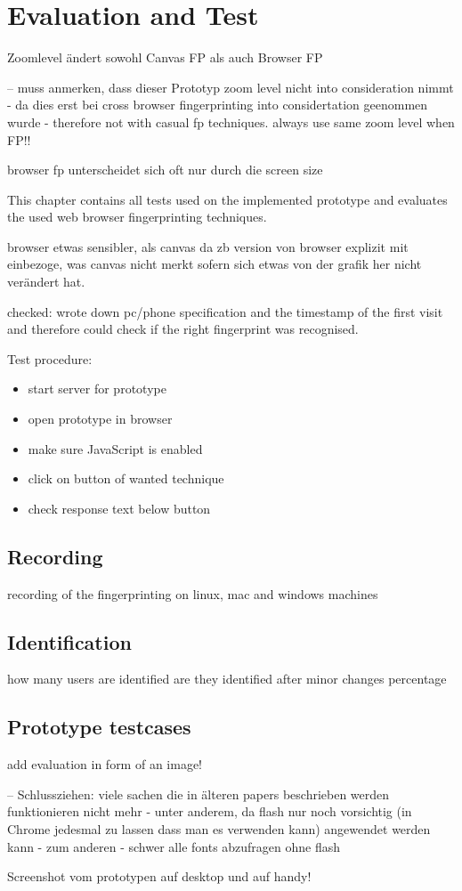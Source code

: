 \chapter{Evaluation and Test}
\label{cha:evaluation}
Zoomlevel ändert sowohl Canvas FP als auch Browser FP

-- muss anmerken, dass dieser Prototyp zoom level nicht into consideration nimmt - da dies erst bei cross browser fingerprinting into considertation geenommen wurde - therefore not with casual fp techniques. always use same zoom level when FP!!

browser fp unterscheidet sich oft nur durch die screen size


This chapter contains all tests used on the implemented prototype and evaluates the used web browser fingerprinting techniques.

browser etwas sensibler, als canvas da zb version von browser explizit mit einbezoge, was canvas nicht merkt sofern sich etwas von der grafik her nicht verändert hat.

checked: wrote down pc/phone specification and the timestamp of the first visit and therefore could check if the right fingerprint was recognised.

Test procedure:
\begin{itemize}
\item start server for prototype
\item open prototype in browser
\item make sure JavaScript is enabled
\item click on button of wanted technique
\item check response text below button
\end{itemize}

\section{Recording}
recording of the fingerprinting
on linux, mac and windows machines

\section{Identification}
how many users are identified
are they identified after minor changes
percentage

\section{Prototype testcases}

add evaluation in form of an image!

--
Schlussziehen: viele sachen die in älteren papers beschrieben werden funktionieren nicht mehr
- unter anderem, da flash nur noch vorsichtig (in Chrome jedesmal zu lassen dass man es verwenden kann) angewendet werden kann
- zum anderen - schwer alle fonts abzufragen ohne flash 


Screenshot vom prototypen
auf desktop und auf handy!

